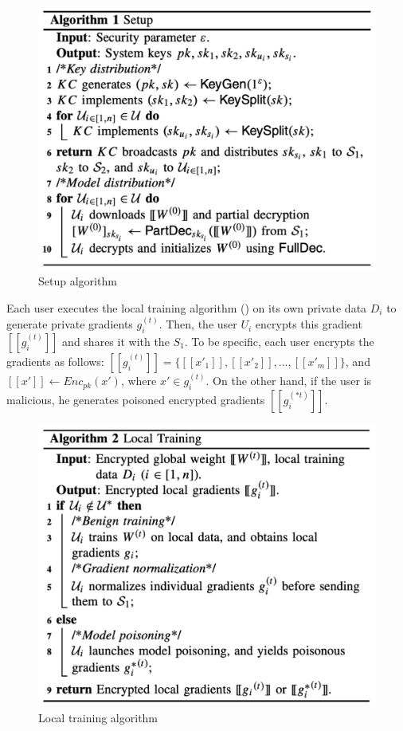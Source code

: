 \begin{figure}[htb]
\centering
  \includegraphics[width=0.8\linewidth]{resources/setup-algo.pdf}
  \caption{Setup algorithm}
  \label{fig:setup-algo}
\end{figure}

Each user executes the local training algorithm () on its own private data $D_i$ to generate private gradients $g_i^{(t)}$.
Then, the user $U_i$ encrypts this gradient $[[g_i^{(t)}]]$ and shares it with the $S_1$.
To be specific, each user encrypts the gradients as follows: $[[g_i^{(t)}]] = \{ [[x'_1]], [[x'_2]], ..., [[x'_m]]\}$, and $[[x']] \leftarrow Enc_{pk}(x')$, where $x' \in g_i^{(t)}$.
On the other hand, if the user is malicious, he generates poisoned encrypted gradients $[[g_i^{(*t)}]]$.

\begin{figure}[htb]
\centering
  \includegraphics[width=0.8\linewidth]{resources/local-training.pdf}
  \caption{Local training algorithm}
  \label{fig:local-training-algo}
\end{figure}

